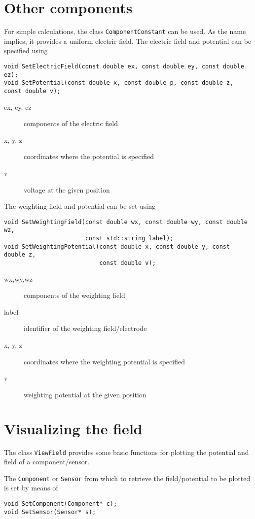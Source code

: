 \section{Other components}
For simple calculations, the class \texttt{ComponentConstant} can be used. 
As the name implies, it provides a uniform electric field. 
The electric field and potential can be specified using
\begin{lstlisting}
void SetElectricField(const double ex, const double ey, const double ez);
void SetPotential(const double x, const double p, const double z, const double v);
\end{lstlisting}
\begin{description}
  \item[ex, ey, ez]
  components of the electric field
  \item[x, y, z]
  coordinates where the potential is specified
  \item[v]
  voltage at the given position
\end{description}
The weighting field and potential can be set using
\begin{lstlisting}
void SetWeightingField(const double wx, const double wy, const double wz,
                       const std::string label);
void SetWeightingPotential(const double x, const double y, const double z,
                           const double v);
\end{lstlisting}
\begin{description}
  \item[wx,wy,wz] components of the weighting field
  \item[label] identifier of the weighting field/electrode
  \item[x, y, z] coordinates where the weighting potential is specified
  \item[v] weighting potential at the given position 
\end{description}

\section{Visualizing the field}

The class \texttt{ViewField} provides some basic functions 
for plotting the potential and field of a component/sensor.

The \texttt{Component} or \texttt{Sensor} from which to retrieve the 
field/potential to be plotted is set by means of
\begin{lstlisting}
void SetComponent(Component* c);
void SetSensor(Sensor* s);
\end{lstlisting}

